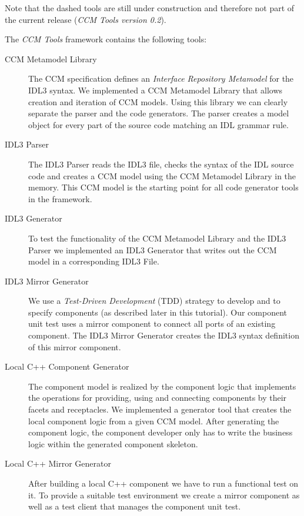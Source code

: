 Note that the dashed tools are still under construction and therefore not part
of the current release ({\it CCM Tools version 0.2}).

\newpage
\noindent
The {\it CCM Tools} framework contains the following tools:

\begin{description}
\item [CCM Metamodel Library]
The CCM specification defines an {\it Interface Repository Metamodel} for the
IDL3 syntax. We implemented a CCM Metamodel Library that allows creation and
iteration of CCM models. Using this library we can clearly separate the parser
and the code generators. The parser creates a model object for every part of the
source code matching an IDL grammar rule.

\item [IDL3 Parser]
The IDL3 Parser reads the IDL3 file, checks the syntax of the IDL source code
and creates a CCM model using the CCM Metamodel Library in the memory. This CCM
model is the starting point for all code generator tools in the framework.

\item [IDL3 Generator]
To test the functionality of the CCM Metamodel Library and the IDL3 Parser we implemented
an IDL3 Generator that writes out the CCM model in a corresponding IDL3 File.

\item [IDL3 Mirror Generator]
We use a {\it Test-Driven Development} (TDD) strategy to develop and to specify
components (as described later in this tutorial). Our component unit test uses a
mirror component to connect all ports of an existing component. The IDL3 Mirror
Generator creates the IDL3 syntax definition of this mirror component.

\item [Local C++ Component Generator]
The component model is realized by the component logic that implements the
operations for providing, using and connecting components by their facets and
receptacles. We implemented a generator tool that creates the local component
logic from a given CCM model. After generating the component logic, the
component developer only has to write the business logic within the generated
component skeleton.

\item [Local C++ Mirror Generator]
After building a local C++ component we have to run a functional test on it. To
provide a suitable test environment we create a mirror component as well as a
test client that manages the component unit test.


\end{description}
